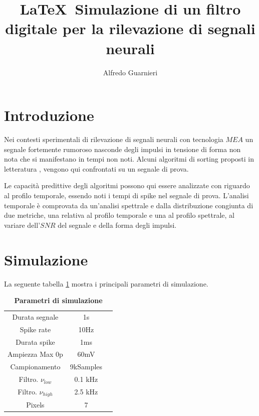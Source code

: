 \documentclass[9pt,twocolumn,twoside]{osajnl}
\title{\LaTeX\  Simulazione di un filtro digitale per la rilevazione di segnali neurali \emph{ }}
\author[1]{Alfredo Guarnieri}
\begin{document}
\maketitle



\section{Introduzione}

Nei contesti sperimentali di rilevazione di segnali neurali con tecnologia $MEA$ un segnale fortemente rumoroso nasconde degli impulsi in tensione di forma non nota che si manifestano in tempi non noti. Alcuni algoritmi di sorting proposti in letteratura
\cite{Vallicelli2017}, \cite{Lambacher2011} vengono  qui confrontati su un segnale di prova.

Le capacità predittive degli algoritmi possono qui essere analizzate con riguardo al profilo temporale, essendo noti i tempi di spike nel segnale di prova. L'analisi temporale è comprovata da un'analisi spettrale e dalla distribuzione congiunta di due metriche, una relativa al profilo temporale e una al profilo spettrale, al variare dell'$SNR$ del segnale e della forma degli impulsi.


% 



\section{Simulazione}
\label{sec:examples}

La seguente tabella \ref{tab:param} mostra i principali parametri di simulazione.

\begin{table}[htbp]
\centering
\caption{\bf Parametri di simulazione}
\begin{tabular}{ccc}
\hline
Durata segnale       & 1s        \\
Spike rate           & 10Hz      \\
Durata spike         & 1ms       \\
Ampiezza Max 0p      & 60mV      \\
Campionamento        & 9kSamples \\
Filtro. $\nu_{low}$  & 0.1 kHz   \\
Filtro. $\nu_{high}$ & 2.5 kHz   \\
Pixels               & 7         \\
\hline
\end{tabular}
\label{tab:param}
\end{table}
\end{document}
